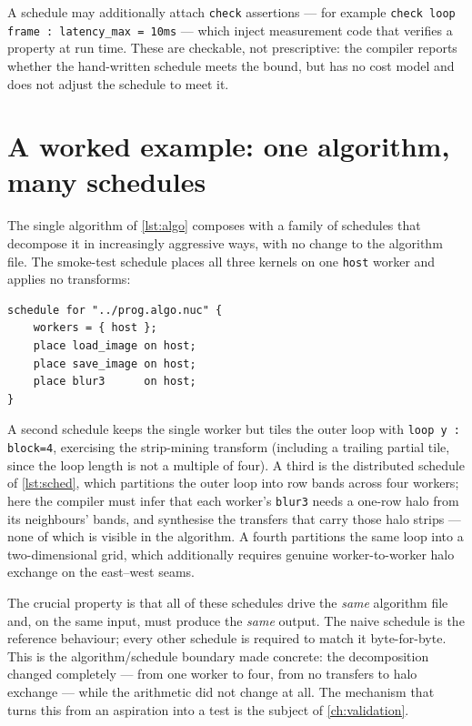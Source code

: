 A schedule may additionally attach \texttt{check} assertions --- for example
\texttt{check loop frame : latency\_max = 10ms} --- which inject measurement code
that verifies a property at run time. These are checkable, not prescriptive: the
compiler reports whether the hand-written schedule meets the bound, but has no
cost model and does not adjust the schedule to meet it.

\section{A worked example: one algorithm, many schedules}\label{sec:lang-example}

The single algorithm of \cref{lst:algo} composes with a family of schedules that
decompose it in increasingly aggressive ways, with no change to the algorithm
file. The smoke-test schedule places all three kernels on one \texttt{host}
worker and applies no transforms:

\begin{lstlisting}[language=Nuc,caption={The naive single-worker schedule for the same algorithm.},label={lst:sched-naive}]
schedule for "../prog.algo.nuc" {
    workers = { host };
    place load_image on host;
    place save_image on host;
    place blur3      on host;
}
\end{lstlisting}

A second schedule keeps the single worker but tiles the outer loop with
\texttt{loop y : block=4}, exercising the strip-mining transform (including a
trailing partial tile, since the loop length is not a multiple of four). A third
is the distributed schedule of \cref{lst:sched}, which partitions the outer loop
into row bands across four workers; here the compiler must infer that each
worker's \texttt{blur3} needs a one-row halo from its neighbours' bands, and
synthesise the transfers that carry those halo strips --- none of which is
visible in the algorithm. A fourth partitions the same loop into a
two-dimensional grid, which additionally requires genuine worker-to-worker halo
exchange on the east--west seams.

The crucial property is that all of these schedules drive the \emph{same}
algorithm file and, on the same input, must produce the \emph{same} output. The
naive schedule is the reference behaviour; every other schedule is required to
match it byte-for-byte. This is the algorithm/schedule boundary made concrete:
the decomposition changed completely --- from one worker to four, from no
transfers to halo exchange --- while the arithmetic did not change at all. The
mechanism that turns this from an aspiration into a test is the subject of
\cref{ch:validation}.

